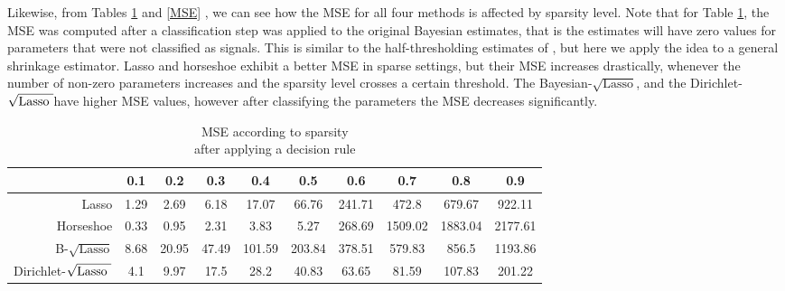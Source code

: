 \documentclass[ba]{imsart}
\def\sql{$\sqrt{\text{Lasso}}$}
\def\sqdl{Dirichlet-$\sqrt{\text{\rm{Lasso} }}$}
\begin{document}
Likewise, from Tables \ref{MSE_dec} and \ref{MSE} , we can see how the MSE for all four methods is affected by sparsity level. Note that for Table \ref{MSE_dec}, the MSE was computed after a classification step was applied to the original Bayesian estimates, that is the estimates will have zero values for parameters that were not classified as signals. This is similar to the half-thresholding estimates of \cite{tang2016bayesian}, but here we apply the idea to a general shrinkage estimator. Lasso and horseshoe exhibit a better MSE in sparse settings, but their MSE increases drastically, whenever the number of non-zero parameters increases and the sparsity level crosses a certain threshold. The Bayesian-\sql, and the \sqdl have higher MSE values, however after classifying the parameters the MSE decreases significantly. 



\begin{table}[h!]
\caption{MSE according to sparsity\\ after applying a decision rule}\label{MSE_dec}
\begin{center}
\footnotesize{
\begin{tabular}{c|c|c|c|c|c|c|c|c|c|}
\cline{2-10}
    & 0.1  &  0.2  &  0.3  &  0.4  &  0.5 &   0.6  &  0.7  &  0.8 &   0.9 	\\
\hline
\multicolumn{1}{|r|}{Lasso} & 1.29 &  2.69 &  6.18 &  17.07 & 66.76 &  241.71 & 472.8 &  679.67 &  922.11	\\
\hline
\multicolumn{1}{|r|}{Horseshoe} &   0.33 & 0.95 &  2.31 &  3.83 &   5.27 &   268.69 & 1509.02 & 1883.04 & 2177.61 \\
\hline
\multicolumn{1}{|r|}{B-\sql} & 8.68 & 20.95 & 47.49 & 101.59 & 203.84 & 378.51 & 579.83 &  856.5 &   1193.86 \\
\hline
\multicolumn{1}{|r|}{\sqdl} &4.1 &  9.97 &  17.5 &  28.2 &   40.83 &  63.65 &  81.59 &   107.83 &  201.22 \\
\hline
\end{tabular}}
\end{center}

\end{table}
\end{document}
